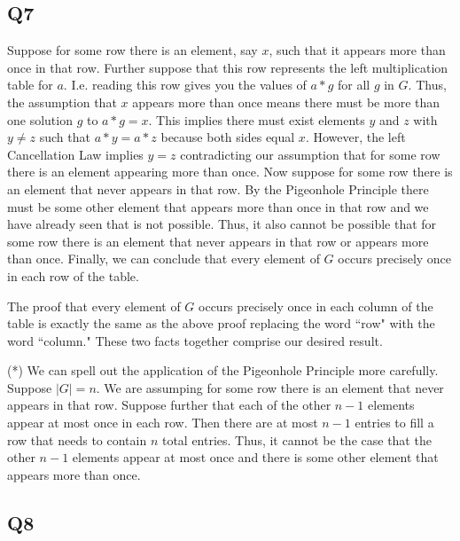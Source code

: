 \documentclass[12pt]{article}
\numberwithin{theorem}{section}
\numberwithin{equation}{section}
\numberwithin{remark}{section}
\numberwithin{definition}{section}
\numberwithin{theorem}{section}
\numberwithin{lemma}{section}
\numberwithin{example}{section}
\begin{document}
\subsection{Q7}

Suppose for some row there is an element, say $x$, such that it appears more than once in that row. Further suppose that this row represents the left multiplication table for $a$. I.e. reading this row gives you the values of $a*g$ for all $g$ in $G$. Thus, the assumption that $x$ appears more than once means there must be more than one solution $g$ to $a*g=x$. This implies there must exist elements $y$ and $z$ with $y\neq z$ such that $a*y=a*z$ because both sides equal $x$. However, the left Cancellation Law implies $y=z$ contradicting our assumption that for some row there is an element appearing more than once. Now suppose for some row there is an element that never appears in that row. By the Pigeonhole Principle there must be some other element that appears more than once in that row and we have already seen that is not possible. Thus, it also cannot be possible that for some row there is an element that never appears in that row or appears more than once. Finally, we can conclude that every element of $G$ occurs precisely once in each row of the table. 

The proof that every element of $G$ occurs precisely once in each column of the table is exactly the same as the above proof replacing the word ``row" with the word ``column." These two facts together comprise our desired result.

\vspace{\baselineskip}

\noindent (*) We can spell out the application of the Pigeonhole Principle more carefully. Suppose $|G|=n$. We are assumping for some row there is an element that never appears in that row. Suppose further that each of the other $n-1$ elements appear at most once in each row. Then there are at most $n-1$ entries to fill a row that needs to contain $n$ total entries. Thus, it cannot be the case that the other $n-1$ elements appear at most once and there is some other element that appears more than once.



\subsection{Q8}
\end{document}

